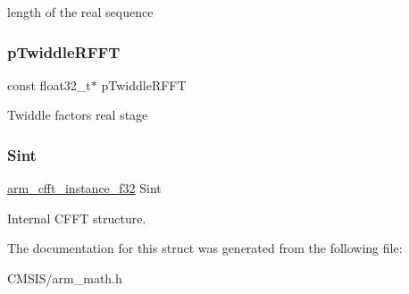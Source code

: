 length of the real sequence \mbox{\label{structarm__rfft__fast__instance__f32_ae701bffa723225a574f41989e62cff2e}} 
\subsubsection{\texorpdfstring{pTwiddleRFFT}{pTwiddleRFFT}}
{\footnotesize\ttfamily const float32\+\_\+t$\ast$ p\+Twiddle\+R\+F\+FT}

Twiddle factors real stage \mbox{\label{structarm__rfft__fast__instance__f32_aa8a05a9fabc3852e5d476152a5067e53}} 
\subsubsection{\texorpdfstring{Sint}{Sint}}
{\footnotesize\ttfamily \mbox{\hyperlink{structarm__cfft__instance__f32}{arm\+\_\+cfft\+\_\+instance\+\_\+f32}} Sint}

Internal C\+F\+FT structure. 

The documentation for this struct was generated from the following file\+:\begin{DoxyCompactItemize}
\item 
C\+M\+S\+I\+S/arm\+\_\+math.\+h\end{DoxyCompactItemize}
